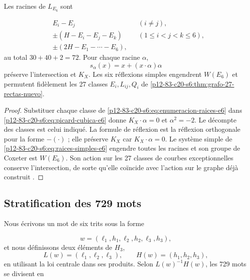 \begin{proposition}
\label{p12-83-c20-s6:prop:setenta-dos-raices-e6}
Les racines de \(L_{E_6}\) sont

\begin{equation}
 \begin{aligned}
 &E_i-E_j &&(i\ne j),\\
 &\pm(H-E_i-E_j-E_k) &&(1\le i<j<k\le6),\\
 &\pm(2H-E_1-\cdots-E_6),
 \end{aligned}
 \label{p12-83-c20-s6:eq:enumeracion-raices-e6}
\end{equation}
au total \(30+40+2=72\). Pour chaque racine \(\alpha\),
\begin{equation}
 s_\alpha(x)=x+(x\cdot\alpha)\alpha
 \label{p12-83-c20-s6:eq:reflexion-raiz-e6}
\end{equation}
préserve l’intersection et \(K_X\). Les six réflexions simples engendrent
\(W(E_6)\) et permutent fidèlement les 27 classes
\(E_i,L_{ij},Q_i\) de \cref{p12-83-c20-s6:thm:grafo-27-rectas-nuevo}.

\end{proposition}

\begin{proof}
Substituer chaque classe de \cref{p12-83-c20-s6:eq:enumeracion-raices-e6} dans \cref{p12-83-c20-s6:eq:picard-cubica-e6} donne \(K_X\cdot\alpha=0\) et \(\alpha^2=-2\). Le décompte des classes est celui indiqué. La formule de réflexion est la réflexion orthogonale pour la forme \(-(\cdot)\) ; elle préserve \(K_X\) car \(K_X\cdot\alpha=0\). Le système simple de \cref{p12-83-c20-s6:eq:raices-simples-e6} engendre toutes les racines et son groupe de Coxeter est \(W(E_6)\). Son action sur les 27 classes de courbes exceptionnelles conserve l'intersection, de sorte qu'elle coïncide avec l'action sur le graphe déjà construit \cite{Manivel2005}.
\end{proof}

\subsection{Stratification des 729 mots
}

Nous écrivons un mot de six trits sous la forme

\[
 w=(\ell_1,h_1,\ell_2,h_2,\ell_3,h_3),
\]
et nous définissons deux éléments de \(H_3\),
\[
 L(w)=(\ell_1,\ell_2,\ell_3),\qquad
 H(w)=(h_1,h_2,h_3),
\]
en utilisant la loi centrale dans ses produits. Selon
\(L(w)^{-1}H(w)\), les 729 mots se divisent en

